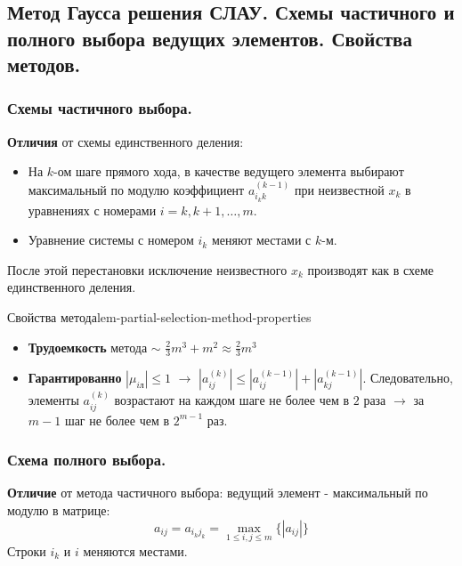\documentclass[14pt]{extarticle}
\begin{document}
\clearpage
\subsection{Метод Гаусса решения СЛАУ. Схемы частичного и полного выбора ведущих элементов. Свойства методов.}

    \subsubsection{Схемы частичного выбора.}

        \textbf{Отличия} от схемы единственного деления:
        \begin{itemize}
            \item На $k$-ом шаге прямого хода, в качестве ведущего элемента выбирают максимальный по модулю коэффициент $a_{i_{k}k}^{(k - 1)}$ при неизвестной $x_{k}$ в уравнениях с номерами $i = k, k+1, \ldots, m$.
            \item Уравнение системы с номером $i_{k}$ меняют местами с $k$-м. 
        \end{itemize}

        После этой перестановки исключение неизвестного $x_{k}$ производят как в схеме единственного деления.

        \begin{lemma}{Свойства метода}{lem-partial-selection-method-properties}
            \begin{itemize}
                \item \textbf{Трудоемкость} метода $\sim$ $\frac{2}{3} m^{3} + m^{2} \approx \frac{2}{3}m^{3}$
                \item \textbf{Гарантированно} $|\mu_{iл}| \leq 1$ $\rightarrow$ $|a_{ij}^{(k)}| \leq |a_{ij}^{(k - 1)}| + |a_{kj}^{(k - 1)}|$. Следовательно, элементы $a_{ij}^{(k)}$ возрастают на каждом шаге не более чем в $2$ раза $\rightarrow$ за $m - 1$ шаг не более чем в $2^{m - 1}$ раз.
            \end{itemize}
        \end{lemma}

    \subsubsection{Схема полного выбора.}

        \textbf{Отличие} от метода частичного выбора: ведущий элемент - максимальный по модулю в матрице:
        $$a_{ij} = a_{i_{k}j_{k}} = \max_{1 \leq i, j \leq m}\{|a_{ij}|\}$$
        Строки $i_{k}$ и $i$ меняются местами.
\end{document}
